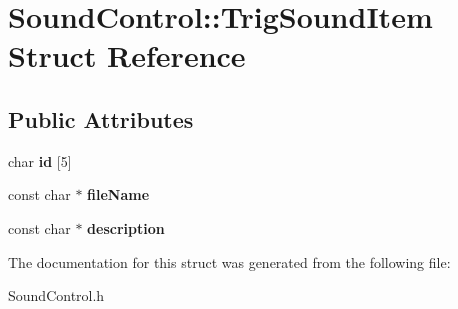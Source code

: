 \hypertarget{structSoundControl_1_1TrigSoundItem}{\section{\-Sound\-Control\-:\-:\-Trig\-Sound\-Item \-Struct \-Reference}
\label{structSoundControl_1_1TrigSoundItem}
}
\subsection*{\-Public \-Attributes}
\begin{DoxyCompactItemize}
\item 
\hypertarget{structSoundControl_1_1TrigSoundItem_a92454c67dde49ccd415f37e04bdd4dfc}{char {\bfseries id} \mbox{[}5\mbox{]}}\label{structSoundControl_1_1TrigSoundItem_a92454c67dde49ccd415f37e04bdd4dfc}

\item 
\hypertarget{structSoundControl_1_1TrigSoundItem_a4519e73384fda899a43a7e0facaf9543}{const char $\ast$ {\bfseries file\-Name}}\label{structSoundControl_1_1TrigSoundItem_a4519e73384fda899a43a7e0facaf9543}

\item 
\hypertarget{structSoundControl_1_1TrigSoundItem_a19d2b8df1fc90cc00fb96f3698620299}{const char $\ast$ {\bfseries description}}\label{structSoundControl_1_1TrigSoundItem_a19d2b8df1fc90cc00fb96f3698620299}

\end{DoxyCompactItemize}


\-The documentation for this struct was generated from the following file\-:\begin{DoxyCompactItemize}
\item 
\-Sound\-Control.\-h\end{DoxyCompactItemize}
